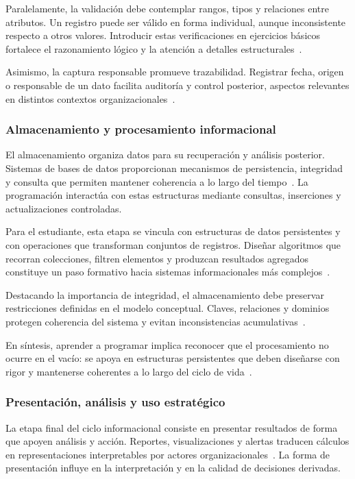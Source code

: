 \documentclass[12pt,twoside]{book}
\begin{document}
						Paralelamente, la validación debe contemplar rangos, tipos y relaciones entre atributos. Un registro puede ser válido en forma individual, aunque inconsistente respecto a otros valores. Introducir estas verificaciones en ejercicios básicos fortalece el razonamiento lógico y la atención a detalles estructurales~\cite{Wirth1976Algorithms,Ghezzi2003Fundamentals,Sommerville2015Software}.
						
						Asimismo, la captura responsable promueve trazabilidad. Registrar fecha, origen o responsable de un dato facilita auditoría y control posterior, aspectos relevantes en distintos contextos organizacionales~\cite{Laudon2020Management,Kendall2014Systems,Elmasri2016Database}.
						
					\subsubsection{Almacenamiento y procesamiento informacional}
						\noindent
						El almacenamiento organiza datos para su recuperación y análisis posterior. Sistemas de bases de datos proporcionan mecanismos de persistencia, integridad y consulta que permiten mantener coherencia a lo largo del tiempo~\cite{Elmasri2016Database,Silberschatz2020Database,Date2019Database}. La programación interactúa con estas estructuras mediante consultas, inserciones y actualizaciones controladas.
						
						Para el estudiante, esta etapa se vincula con estructuras de datos persistentes y con operaciones que transforman conjuntos de registros. Diseñar algoritmos que recorran colecciones, filtren elementos y produzcan resultados agregados constituye un paso formativo hacia sistemas informacionales más complejos~\cite{Hanly2015Problem,Gaddis2022Starting,Wirth1976Algorithms}.
						
						Destacando la importancia de integridad, el almacenamiento debe preservar restricciones definidas en el modelo conceptual. Claves, relaciones y dominios protegen coherencia del sistema y evitan inconsistencias acumulativas~\cite{Elmasri2016Database,Date2019Database,Ghezzi2003Fundamentals}.
						
						En síntesis, aprender a programar implica reconocer que el procesamiento no ocurre en el vacío: se apoya en estructuras persistentes que deben diseñarse con rigor y mantenerse coherentes a lo largo del ciclo de vida~\cite{Laudon2020Management,Sommerville2015Software,Tegarden2025Systems}.
						
					\subsubsection{Presentación, análisis y uso estratégico}
						\noindent
						La etapa final del ciclo informacional consiste en presentar resultados de forma que apoyen análisis y acción. Reportes, visualizaciones y alertas traducen cálculos en representaciones interpretables por actores organizacionales~\cite{Laudon2020Management,Calzati2025Ecosystemic,Bernstein2009Data}. La forma de presentación influye en la interpretación y en la calidad de decisiones derivadas.
						
\end{document}
